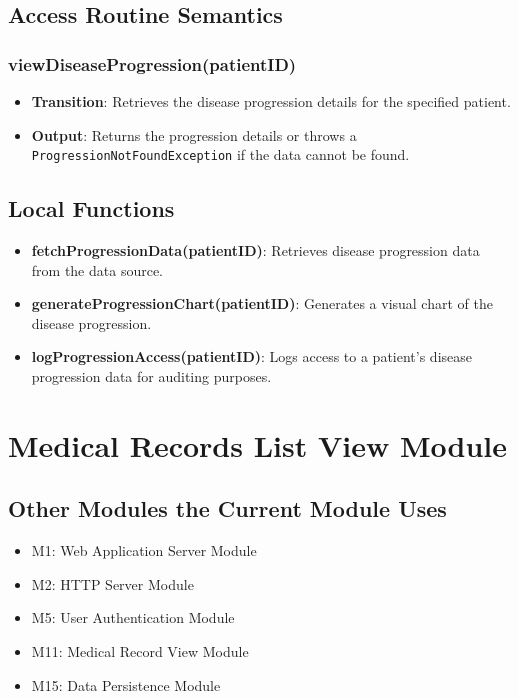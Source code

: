 \documentclass[12pt, titlepage]{article}
\begin{document}
\subsection{Access Routine Semantics}
\subsubsection{viewDiseaseProgression(patientID)}
\begin{itemize}
    \item \textbf{Transition}: Retrieves the disease progression details for the specified patient.
    \item \textbf{Output}: Returns the progression details or throws a \texttt{ProgressionNotFoundException} if the data cannot be found.
\end{itemize}

\subsection{Local Functions}
\begin{itemize}
\item \textbf{fetchProgressionData(patientID)}: Retrieves disease progression data from the data source.
\item \textbf{generateProgressionChart(patientID)}: Generates a visual chart of the disease progression.
\item \textbf{logProgressionAccess(patientID)}: Logs access to a patient's disease progression data for auditing purposes.
\end{itemize}
\section{Medical Records List View Module}

\subsection{Other Modules the Current Module Uses}
\begin{itemize}
    \item M1: Web Application Server Module
    \item M2: HTTP Server Module
    \item M5: User Authentication Module
    \item M11: Medical Record View Module
    \item M15: Data Persistence Module
\end{itemize}
\end{document}
